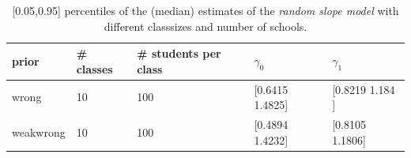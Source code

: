 \begin{table}[!ht]
\begin{center}
\begin{tabular}{l l l l  l}
prior & \# classes & \#  students per class &  $\gamma_0$ & $ \gamma_1$ \\
\hline
wrong &10  &  100  &  [0.6415 1.4825]  &  [0.8219 1.184 ]\\
weakwrong & 10  &  100  &  [0.4894 1.4232]  &  [0.8105 1.1806]\\
\hline
\end{tabular}
\end{center}
\caption{ [0.05,0.95] percentiles of the (median) estimates of the  \emph{random slope model}  with different classsizes and number of schools. }
\label{tab:median}
\end{table}
